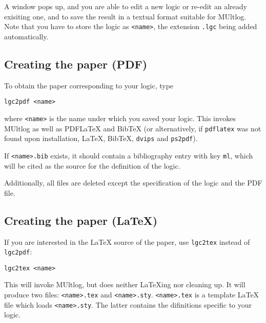 \documentclass[]{article}
\begin{document}
A window pops up, and you are able to edit a new logic or re-edit an
already exisiting one, and to save the result in a textual format
suitable for MUltlog. Note that you have to store the logic as
\texttt{\textless{}name\textgreater{}}, the extension \texttt{.lgc}
being added automatically.

\hypertarget{creating-the-paper-pdf}{%
\subsection{Creating the paper (PDF)}\label{creating-the-paper-pdf}}

To obtain the paper corresponding to your logic, type

\begin{verbatim}
lgc2pdf <name>
\end{verbatim}

where \texttt{\textless{}name\textgreater{}} is the name under which you
saved your logic. This invokes MUltlog as well as PDFLaTeX and BibTeX
(or alternatively, if \texttt{pdflatex} was not found upon installation,
LaTeX, BibTeX, \texttt{dvips} and \texttt{ps2pdf}).

If \texttt{\textless{}name\textgreater{}.bib} exists, it should contain
a bibliography entry with key \texttt{ml}, which will be cited as the
source for the definition of the logic.

Additionally, all files are deleted except the specification of the
logic and the PDF file.

\hypertarget{creating-the-paper-latex}{%
\subsection{Creating the paper (LaTeX)}\label{creating-the-paper-latex}}

If you are interested in the LaTeX source of the paper, use
\texttt{lgc2tex} instead of \texttt{lgc2pdf}:

\begin{verbatim}
lgc2tex <name>
\end{verbatim}

This will invoke MUltlog, but does neither LaTeXing nor cleaning up. It
will produce two files: \texttt{\textless{}name\textgreater{}.tex} and
\texttt{\textless{}name\textgreater{}.sty}.
\texttt{\textless{}name\textgreater{}.tex} is a template LaTeX file
which loads \texttt{\textless{}name\textgreater{}.sty}. The latter
contains the difinitions specific to your logic.
\end{document}
